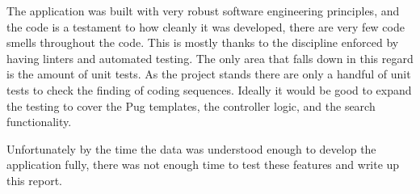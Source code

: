 The application was built with very robust software engineering principles, and the code is a testament to how cleanly it was developed, there are very few code smells\cite{smells} throughout the code. This is mostly thanks to the discipline enforced by having linters and automated testing. The only area that falls down in this regard is the amount of unit tests. As the project stands there are only a handful of unit tests to check the finding of coding sequences. Ideally it would be good to expand the testing to cover the Pug templates, the controller logic, and the search functionality. 

Unfortunately by the time the data was understood enough to develop the application fully, there was not enough time to test these features and write up this report. 






